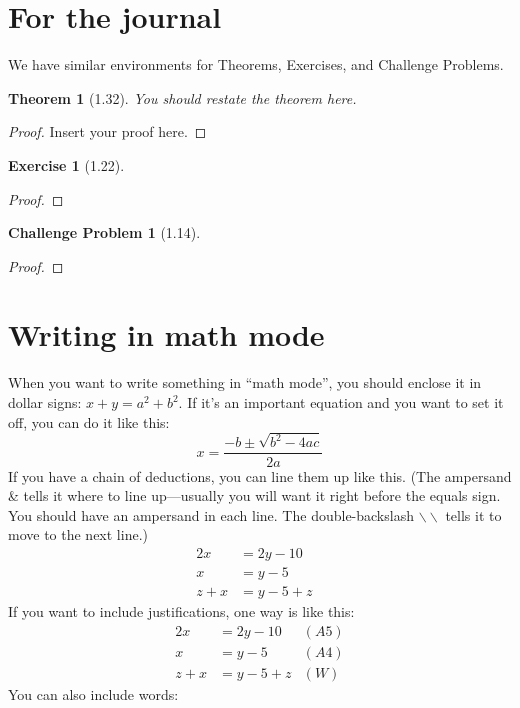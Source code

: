 \documentclass[11pt]{article}
\theoremstyle{quest}
\newtheorem*{theorem}{Theorem}
\newtheorem*{exercise}{Exercise}
\newtheorem*{challengeproblem}{Challenge Problem}
\begin{document}
\section*{For the journal}

We have similar environments for Theorems, Exercises, and Challenge Problems.

\begin{theorem}[1.32]
  You should restate the theorem here.
\end{theorem}
\begin{proof}
  Insert your proof here.
\end{proof}


\begin{exercise}[1.22]

\end{exercise}
\begin{proof}

\end{proof}


\begin{challengeproblem}[1.14]

\end{challengeproblem}
\begin{proof}

\end{proof}




\section*{Writing in math mode}
When you want to write something in ``math mode'', you should enclose it in dollar signs: $x+y=a^2+b^2$.
If it's an important equation and you want to set it off, you can do it like this: \[x = \frac{-b \pm \sqrt{b^2-4ac} }{2a}\]
If you have a chain of deductions, you can line them up like this. (The ampersand \& tells it where to line up---usually you will want it right before the equals sign. You should have an ampersand in each line. The double-backslash $\backslash\backslash$ tells it to move to the next line.)
\begin{align*}
  2x &= 2y-10&\\
  x &=y-5 &\\
  z+x &= y-5+z
\end{align*}
If you want to include justifications, one way is like this:
\begin{align*}
  2x &= 2y-10 & (A5)\\
  x &=y-5  & (A4)\\
  z+x &= y-5+z & (W)
\end{align*}
You can also include words:
\end{document}
